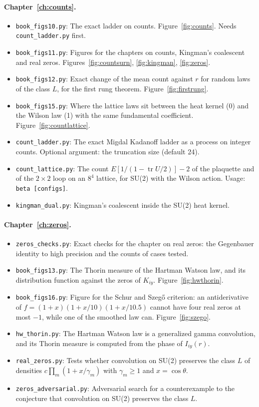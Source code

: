 \paragraph{Chapter~\ref{ch:counts}.}\nopagebreak
\begin{itemize}\setlength{\itemsep}{0pt}\setlength{\parskip}{0pt}
\item \texttt{book\_figs10.py}: The exact ladder on counts. Figure~\ref{fig:counts}. Needs \texttt{count\_ladder.py} first.
\item \texttt{book\_figs11.py}: Figures for the chapters on counts, Kingman's coalescent and real zeros. Figures~\ref{fig:countsurn}, \ref{fig:kingman}, \ref{fig:zeros}.
\item \texttt{book\_figs12.py}: Exact change of the mean count against $r$ for random laws of the class $L$, for the first rung theorem. Figure~\ref{fig:firstrung}.
\item \texttt{book\_figs15.py}: Where the lattice laws sit between the heat kernel (0) and the Wilson law (1) with the same fundamental coefficient. Figure~\ref{fig:countlattice}.
\item \texttt{count\_ladder.py}: The exact Migdal Kadanoff ladder as a process on integer counts. Optional argument: the truncation size (default 24).
\item \texttt{count\_lattice.py}: The count $E[1/(1-\operatorname{tr}U/2)]-2$ of the plaquette and of the $2\times 2$ loop on an $8^4$ lattice, for SU(2) with the Wilson action. Usage: \texttt{beta [configs]}.
\item \texttt{kingman\_dual.py}: Kingman's coalescent inside the SU(2) heat kernel.
\end{itemize}
\paragraph{Chapter~\ref{ch:zeros}.}\nopagebreak
\begin{itemize}\setlength{\itemsep}{0pt}\setlength{\parskip}{0pt}
\item \texttt{zeros\_checks.py}: Exact checks for the chapter on real zeros: the Gegenbauer identity to high precision and the counts of cases tested.
\item \texttt{book\_figs13.py}: The Thorin measure of the Hartman Watson law, and its distribution function against the zeros of $K_{iy}$. Figure~\ref{fig:hwthorin}.
\item \texttt{book\_figs16.py}: Figure for the Schur and Szeg\H o criterion: an antiderivative of $f=(1+x)(1+x/10)(1+x/10.5)$ cannot have four real zeros at most $-1$, while one of the smoothed law can. Figure~\ref{fig:szego}.
\item \texttt{hw\_thorin.py}: The Hartman Watson law is a generalized gamma convolution, and its Thorin measure is computed from the phase of $I_{iy}(r)$.
\item \texttt{real\_zeros.py}: Tests whether convolution on SU(2) preserves the class $L$ of densities $c\prod_m(1+x/\gamma_m)$ with $\gamma_m\ge 1$ and $x=\cos\theta$.
\item \texttt{zeros\_adversarial.py}: Adversarial search for a counterexample to the conjecture that convolution on SU(2) preserves the class $L$.
\end{itemize}

